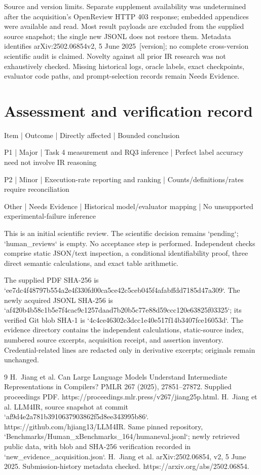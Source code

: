 \documentclass[10pt]{article}
\begin{document}
Source and version limits. Separate supplement availability was undetermined after the acquisition’s OpenReview HTTP 403 response; embedded appendices were available and read. Most result payloads are excluded from the supplied source snapshot; the single new JSONL does not restore them. Metadata identifies arXiv:2502.06854v2, 5 June 2025 [version]; no complete cross-version scientific audit is claimed. Novelty against all prior IR research was not exhaustively checked. Missing historical logs, oracle labels, exact checkpoints, evaluator code paths, and prompt-selection records remain Needs Evidence.\par
\section*{Assessment and verification record}
Item | Outcome | Directly affected | Bounded conclusion\par
P1 | Major | Task 4 measurement and RQ3 inference | Perfect label accuracy need not involve IR reasoning\par
P2 | Minor | Execution-rate reporting and ranking | Counts/definitions/rates require reconciliation\par
Other | Needs Evidence | Historical model/evaluator mapping | No unsupported experimental-failure inference\par
This is an initial scientific review. The scientific decision remains `pending`; `human\_reviews` is empty. No acceptance step is performed. Independent checks comprise static JSON/text inspection, a conditional identifiability proof, three direct semantic calculations, and exact table arithmetic.\par
The supplied PDF SHA-256 is `ee7dc4f48797b554a2e4f330fd00ca5ce42c5ceb045f4afabffdd7185d47a309`. The newly acquired JSONL SHA-256 is `af420b4b58c1b5e7f4cac9c1257daad7b20b5c77e88d59ccc120e63825f03325`; its verified Git blob SHA-1 is `4c4ce46302c3dcc1e40e517f14b3407fce16053d`. The evidence directory contains the independent calculations, static-source index, numbered source excerpts, acquisition receipt, and assertion inventory. Credential-related lines are redacted only in derivative excerpts; originals remain unchanged.\par
9 H. Jiang et al. Can Large Language Models Understand Intermediate Representations in Compilers? PMLR 267 (2025), 27851–27872. Supplied proceedings PDF. https://proceedings.mlr.press/v267/jiang25p.html. H. Jiang et al. LLM4IR, source snapshot at commit `af9d4e2a781b3910637903862f5d8ee343995b86`. https://github.com/hjiang13/LLM4IR. Same pinned repository, `Benchmarks/Human\_xBenchmarks\_164/humaneval.jsonl`; newly retrieved public data, with blob and SHA-256 verification recorded in `new\_evidence\_acquisition.json`. H. Jiang et al. arXiv:2502.06854, v2, 5 June 2025. Submission-history metadata checked. https://arxiv.org/abs/2502.06854.\par
\end{document}
